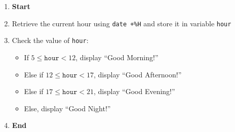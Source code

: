 \begin{enumerate}
    \item \textbf{Start}
    \item Retrieve the current hour using \texttt{date +\%H} and store it in variable \texttt{hour}
    \item Check the value of \texttt{hour}:
    \begin{itemize}
        \item If $5 \leq \texttt{hour} < 12$, display ``Good Morning!''
        \item Else if $12 \leq \texttt{hour} < 17$, display ``Good Afternoon!''
        \item Else if $17 \leq \texttt{hour} < 21$, display ``Good Evening!''
        \item Else, display ``Good Night!''
    \end{itemize}
    \item \textbf{End}
\end{enumerate}

